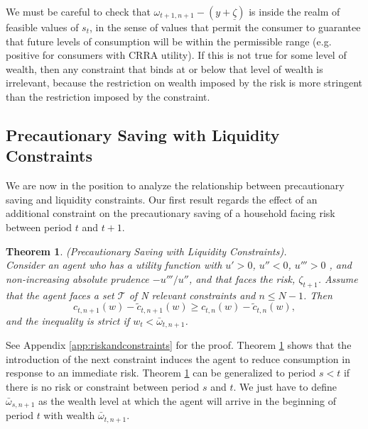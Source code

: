 \documentclass[titlepage]{\econtex}
\providecommand{\wAlt}{\omega}
\newtheorem{theorem}{Theorem}
\begin{document}
We must be careful to check that $\wAlt_{t+1,n+1}-({y}+\underline{\zeta})$ is inside the realm of feasible values of $s_{t}$, in the sense of values that permit the consumer to guarantee that future levels of consumption will be within the permissible range (e.g. positive for consumers with CRRA utility). If this is not true for some level of wealth, then any constraint that binds at or below that level of wealth is irrelevant, because the restriction on wealth imposed by the risk is more stringent than the restriction imposed by the constraint.


\subsection{Precautionary Saving with Liquidity Constraints}

We are now in the position to analyze the relationship between precautionary saving and liquidity constraints. Our first result regards the effect of an additional constraint on the precautionary saving of a household facing risk between period $t$ and $t+1$.

\begin{theorem}\label{thm:riskandconstraints} (Precautionary Saving with Liquidity Constraints). \\
	Consider an agent who has a utility function with $u'> 0$, $u''< 0$, $u''' > 0$%
	, and non-increasing absolute prudence $-u'''/u''$, and that faces the risk, $\zeta_{t+1}$. Assume that the agent faces a set $\mathcal{T}$ of N relevant constraints and $n \leq N-1$. Then
	\begin{equation}
	c_{t,n+1}(w) - \tilde{c}_{t,n+1}(w) \geq c_{t,n}(w)-\tilde{c}_{t,n}(w), \label{eq:ineq}
	\end{equation}
	and the inequality is strict if $w_t < \bar{\wAlt}_{t,n+1}$.
\end{theorem}

See Appendix \ref{app:riskandconstraints} for the proof. Theorem \ref{thm:riskandconstraints} shows that the introduction of the next constraint induces the agent to reduce consumption in response to an immediate risk. Theorem \ref{thm:riskandconstraints} can be generalized to period $s < t$ if there is no risk or constraint between period $s$ and $t$. We just have to define $\bar{\wAlt}_{s,n+1}$ as the wealth level at which the agent will arrive in the beginning of period $t$ with wealth $\bar{\wAlt}_{t,n+1}$.
\end{document}
